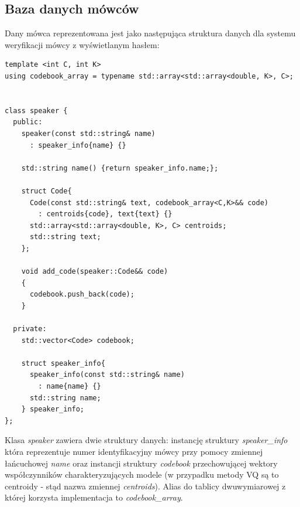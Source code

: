 \subsection{Baza danych mówców}
Dany mówca reprezentowana jest jako następująca struktura danych dla systemu weryfikacji mówcy z wyświetlanym hasłem:
\begin{lstlisting}[style=lst:cpp, caption=struktura danych przechowująca informację o mówcy\label{lst:database}]
template <int C, int K>
using codebook_array = typename std::array<std::array<double, K>, C>; 


class speaker {
  public:
    speaker(const std::string& name)
      : speaker_info{name} {}  

    std::string name() {return speaker_info.name;};

    struct Code{
      Code(const std::string& text, codebook_array<C,K>&& code)
        : centroids{code}, text{text} {}
      std::array<std::array<double, K>, C> centroids;
      std::string text;
    };

    void add_code(speaker::Code&& code)
    {
      codebook.push_back(code); 
    }

  private:
    std::vector<Code> codebook;

    struct speaker_info{
      speaker_info(const std::string& name)
        : name{name} {}
      std::string name;
    } speaker_info;
};
\end{lstlisting}

Klasa \textit{speaker} zawiera dwie struktury danych: instancję struktury \textit{speaker\_info} która reprezentuje numer identyfikacyjny mówcy przy pomocy zmiennej łańcuchowej \textit{name} oraz instancji struktury \textit{codebook} przechowującej wektory współczynników charakteryzujących modele (w przypadku metody VQ są to centroidy - stąd nazwa zmiennej \textit{centroids}). Alias do tablicy dwuwymiarowej z której korzysta implementacja to \textit{codebook\_array}.
